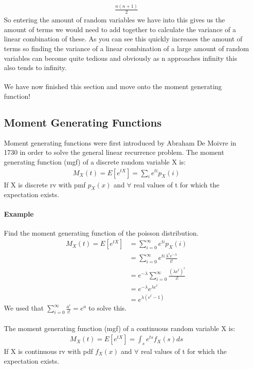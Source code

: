 \documentclass[,oneside]{article}
\begin{document}
\begin{enumerate}
\begin{align*}
\frac{n(n+1)}{2}
\end{align*}
So entering the amount of random variables we have into this gives us the amount of terms we would need to add together to calculate the variance of a linear combination of these. As you can see this quickly increases the amount of terms so finding the variance of a linear combination of a large amount of random variables can become quite tedious and obviously as n approaches infinity this also tends to infinity.\\ \\
We have now finished this section and move onto the moment generating function!
\subsection{Moment Generating Functions}
Moment generating functions were first introduced by Abraham De Moivre in 1730 in order to solve the general linear recurrence problem. The moment generating function (mgf) of a discrete random variable X is:
\begin{align*}
M_X(t)=E[e^{tX}]=\sum_i e^{ti}p_X(i)
\end{align*}
If X is discrete rv with pmf $p_X(x)$ and $\forall$ real values of t for which the expectation exists.\\ \\
\textbf{Example}\\ \\
Find the moment generating function of the poisson distribution.
\begin{align*}
M_X(t)=E[e^{tX}]&=\sum_{i=0}^{\infty} e^{ti} p_X(i)\\
&=\sum_{i=0}^{\infty} e^{ti} \frac{\lambda^i e^{-\lambda}}{i!}\\
&=e^{-\lambda}\sum_{i=0}^{\infty} \frac{(\lambda e^t)^i}{i!}\\
&= e^{-\lambda} e^{\lambda e^t}\\
&= e^{\lambda (e^t-1)}
\end{align*}
We used that $\sum_{i=0}^{\infty} \frac{a^i}{i!} = e^a$ to solve this.\\ \\
The moment generating function (mgf) of a continuous random variable X is:
\begin{align*}
M_X(t)=E[e^{tX}]=\int_s e^{ts}f_X(s)ds
\end{align*}
If X is continuous rv with pdf $f_X(x)$ and $\forall$ real values of t for which the expectation exists.\\ \\

\end{enumerate}
\end{document}
